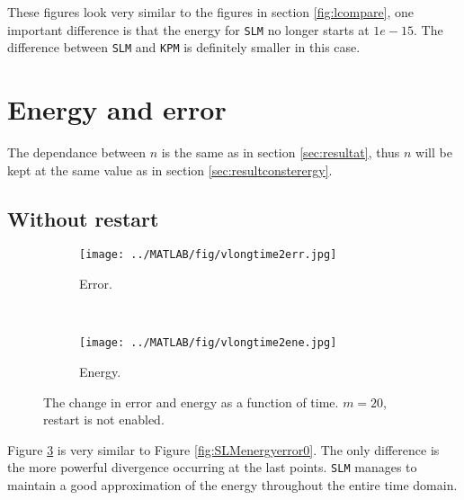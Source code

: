 These figures look very similar to the figures in section \ref{fig:lcompare}, one important difference is that the energy for \texttt{SLM} no longer starts at $1e-15$. The difference between \texttt{SLM} and \texttt{KPM} is definitely smaller in this case.


\section{Energy and error} %
The dependance between $n$ is the same as in section \ref{sec:resultat}, thus $n$ will be kept at the same value as in section \ref{sec:resultconsterergy}.
\subsection{Without restart} %
\begin{figure}[H]
        \centering
        \begin{subfigure}[b]{0.45\textwidth}
                \texttt{[image: ../MATLAB/fig/vlongtime2err.jpg]}
                \caption{ Error. }
                \label{fig:vlongtime2err}
        \end{subfigure}
        ~
        \begin{subfigure}[b]{0.45\textwidth}
                \texttt{[image: ../MATLAB/fig/vlongtime2ene.jpg]}
                \caption{ Energy. }
                \label{fig:vlongtime8err}
        \end{subfigure}
        \caption{ The change in error and energy as a function of time. $m = 20$, restart is not enabled. }
        \label{fig:vSLMenergyerror0}
\end{figure}
\noindent Figure \ref{fig:vSLMenergyerror0} is very similar to Figure \ref{fig:SLMenergyerror0}. The only difference is the more powerful divergence occurring at the last points. \texttt{SLM} manages to maintain a good approximation of the energy throughout the entire time domain. %
